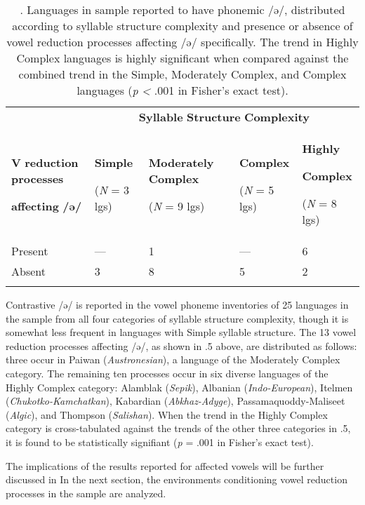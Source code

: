 \begin{table}
\begin{tabularx}{\textwidth}{XXXXX}
\lsptoprule
 & \multicolumn{4}{c}{ \textbf{Syllable} \textbf{Structure} \textbf{Complexity}}\\
{ \textbf{V} \textbf{reduction} \textbf{processes} }

 \textbf{affecting} \textbf{/ə/} & { \textbf{Simple}}

 (\textit{N} = 3 lgs) & { \textbf{Moderately} \textbf{Complex}}

 (\textit{N} = 9 lgs) & { \textbf{Complex}}

 (\textit{N} = 5 lgs) & { \textbf{Highly} }

{ \textbf{Complex}}

 (\textit{N} = 8 lgs)\\
 Present & — & 1 & — & 6\\
 Absent & 3 & 8 & 5 & 2\\
\lspbottomrule
\end{tabularx}
\caption{\label{tab:key:6.5}. Languages in sample reported to have phonemic /ə/, distributed according to syllable structure complexity and presence or absence of vowel reduction processes affecting /ə/ specifically. The trend in Highly Complex languages is highly significant when compared against the combined trend in the Simple, Moderately Complex, and Complex languages (\textit{p} \textit{<} .001 in Fisher’s exact test).}
\end{table}

  Contrastive /ə/ is reported in the vowel phoneme inventories of 25 languages in the sample from all four categories of syllable structure complexity, though it is somewhat less frequent in languages with Simple syllable structure. The 13 vowel reduction processes affecting /ə/, as shown in .5 above, are distributed as follows: three occur in Paiwan (\textit{Austronesian}), a language of the Moderately Complex category. The remaining ten processes occur in six diverse languages of the Highly Complex category: Alamblak (\textit{Sepik}), Albanian (\textit{Indo-European}), Itelmen (\textit{Chukotko-Kamchatkan}), Kabardian (\textit{Abkhaz-Adyge}), Passamaquoddy-Maliseet (\textit{Algic}), and Thompson (\textit{Salishan}). When the trend in the Highly Complex category is cross-tabulated against the trends of the other three categories in .5, it is found to be statistically signifiant (\textit{p} = .001 in Fisher’s exact test).

  The implications of the results reported for affected vowels will be further discussed in  In the next section, the environments conditioning vowel reduction processes in the sample are analyzed.

